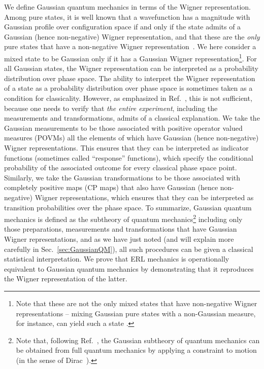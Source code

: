 \documentclass[pra,superscriptaddress,nofootinbib,12pt]{revtex4-2}
\begin{document}
We define Gaussian quantum mechanics in terms of the Wigner representation.  Among pure states, it is well known that a wavefunction has a magnitude with Gaussian profile over configuration space if and only if the state admits of a Gaussian (hence non-negative) Wigner representation, and that these are the \emph{only} pure states that have a non-negative Wigner representation~\cite{Hud74}. We here consider a mixed state to be Gaussian only if it has a Gaussian Wigner representation\footnote{Note that these are not the only mixed states that have non-negative Wigner representations -- mixing Gaussian pure states with a non-Gaussian measure, for instance, can yield such a state \cite{BW95}.}.  For all Gaussian states, the Wigner representation can be interpreted as a probability distribution over phase space.  The ability to interpret the Wigner representation of a state as a probability distribution over phase space is sometimes taken as a condition for classicality.  However, as emphasized in Ref.~\cite{Spe08}, this is not sufficient, because one needs to verify that \emph{the entire experiment}, including the measurements and transformations, admits of a classical explanation.  We take the Gaussian measurements to be those associated with positive operator valued measures (POVMs) all the elements of which have Gaussian (hence non-negative) Wigner representations.  This ensures that they can be interpreted as indicator functions (sometimes called ``response'' functions), which specify the conditional probability of the associated outcome for every classical phase space point. Similarly, we take the Gaussian transformations to be those associated with completely positive maps (CP maps) that also have Gaussian (hence non-negative) Wigner representations, which ensures that they can be interpreted as transition probabilities over the phase space.  To summarize, Gaussian quantum mechanics is defined as the subtheory of quantum mechanics\footnote{Note that, following Ref.~\cite{BartlettRowe}, the  Gaussian subtheory of quantum mechanics can be obtained from full quantum mechanics by applying a constraint to motion (in the sense of Dirac~\cite{Dirac}).} including only those preparations, measurements and transformations that have Gaussian Wigner representations, and as we have just noted (and will explain more carefully in Sec.~\ref{sec:GaussianQM}), all such procedures can be given a classical statistical interpretation.  We prove that ERL mechanics is operationally equivalent to Gaussian quantum mechanics by demonstrating that it reproduces the Wigner representation of the latter.
\end{document}
